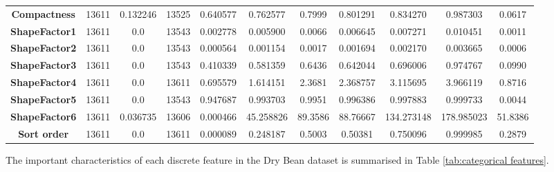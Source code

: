 \documentclass[10pt, conference]{IEEEtran}
\begin{document}
\begin{table}[h!]
\begin{center}
\begin{tabular}{|c||c|c|c|c|c|c|c|c|c|c|}
        \textbf{Compactness}        &13611  &0.132246  &13525   &0.640577	&0.762577	&0.7999	    &0.801291	  &0.834270   &0.987303   &0.0617\\
        \textbf{ShapeFactor1}       &13611  &0.0       &13543   &0.002778   &0.005900   &0.0066 	&0.006645   &0.007271   &0.010451   &0.0011\\
        \textbf{ShapeFactor2}       &13611  &0.0       &13543   &0.000564	&0.001154	&0.0017	    &0.001694	  &0.002170   &0.003665   &0.0006\\
        \textbf{ShapeFactor3}       &13611  &0.0       &13543   &0.410339   &0.581359	&0.6436     &0.642044	  &0.696006	  &0.974767   &0.0990\\
        \textbf{ShapeFactor4}       &13611  &0.0       &13611   &0.695579	&1.614151	&2.3681	  &2.368757   &3.115695	  &3.966119   &0.8716\\
        \textbf{ShapeFactor5}       &13611  &0.0       &13543   &0.947687   &0.993703   &0.9951	  &0.996386	  &0.997883   &0.999733   &0.0044\\
        \textbf{ShapeFactor6}       &13611  &0.036735  &13606   &0.000466	&45.258826	&89.3586	  &88.76667   &134.273148 &178.985023 &51.8386\\
        \textbf{Sort order}         &13611  &0.0       &13611   &0.000089   &0.248187   &0.5003     &0.50381    &0.750096   &0.999985   &0.2879\\

        \hline
    \end{tabular}
    \label{tab:continuous features}
    \end{center}
\end{table}
The important characteristics of each discrete feature in the Dry Bean dataset is summarised in Table
\ref{tab:categorical features}.
\end{document}
